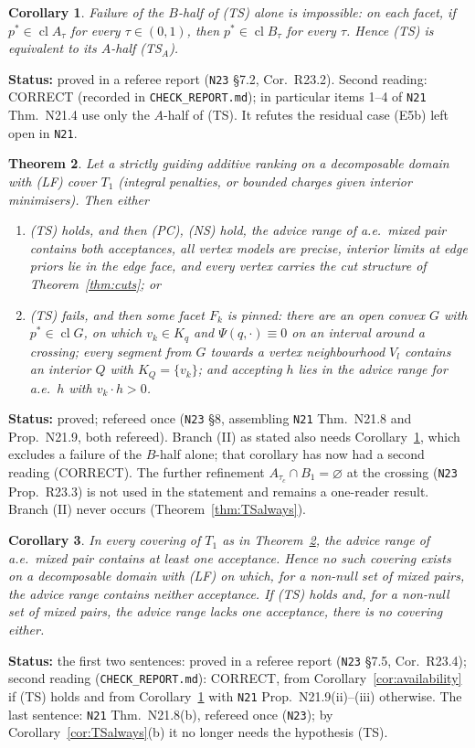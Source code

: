\documentclass[11pt]{article}
\newtheorem{theorem}{Theorem}[section]
\newtheorem{corollary}[theorem]{Corollary}
\theoremstyle{definition}
\theoremstyle{remark}
\newcommand{\cl}{\operatorname{cl}}
\newcommand{\src}[1]{\texttt{#1}}
\newcommand{\status}[1]{\par\smallskip\noindent\textbf{Status:} #1\par\smallskip}
\begin{document}
\begin{corollary}\label{cor:R232}
Failure of the $B$-half of (TS) alone is impossible: on each facet, if $p^*\in\cl A_\tau$ for every $\tau\in(0,1)$, then $p^*\in\cl B_\tau$ for every $\tau$. Hence (TS) is equivalent to its $A$-half (TS$_A$).
\end{corollary}
\status{proved in a referee report (\src{N23} \S7.2, Cor.~R23.2). Second reading: CORRECT (recorded in \src{CHECK\_REPORT.md}); in particular items 1--4 of \src{N21} Thm.~N21.4 use only the $A$-half of (TS). It refutes the residual case (E5b) left open in \src{N21}.}

\begin{theorem}\label{thm:dichotomy}
Let a strictly guiding additive ranking on a decomposable domain with (LF) cover $T_1$ (integral penalties, or bounded charges given interior minimisers). Then either
\begin{enumerate}[leftmargin=*,label=(\Roman*)]
\item (TS) holds, and then (PC), (NS) hold, the advice range of a.e.\ mixed pair contains both acceptances, all vertex models are precise, interior limits at edge priors lie in the edge face, and every vertex carries the cut structure of Theorem~\ref{thm:cuts}; or
\item (TS) fails, and then some facet $F_k$ is pinned: there are an open convex $G$ with $p^*\in\cl G$, on which $v_k\in K_q$ and $\Psi(q,\cdot)\equiv0$ on an interval around a crossing; every segment from $G$ towards a vertex neighbourhood $V_l$ contains an interior $Q$ with $K_Q=\{v_k\}$; and accepting $h$ lies in the advice range for a.e.\ $h$ with $v_k\cdot h>0$.
\end{enumerate}
\end{theorem}
\status{proved; refereed once (\src{N23} \S8, assembling \src{N21} Thm.~N21.8 and Prop.~N21.9, both refereed). Branch (II) as stated also needs Corollary~\ref{cor:R232}, which excludes a failure of the $B$-half alone; that corollary has now had a second reading (CORRECT). The further refinement $A_{\tau_c}\cap B_1=\varnothing$ at the crossing (\src{N23} Prop.~R23.3) is not used in the statement and remains a one-reader result. Branch (II) never occurs (Theorem~\ref{thm:TSalways}).}

\begin{corollary}\label{cor:R234}
In every covering of $T_1$ as in Theorem~\ref{thm:dichotomy}, the advice range of a.e.\ mixed pair contains at least one acceptance. Hence no such covering exists on a decomposable domain with (LF) on which, for a non-null set of mixed pairs, the advice range contains neither acceptance. If (TS) holds and, for a non-null set of mixed pairs, the advice range lacks one acceptance, there is no covering either.
\end{corollary}
\status{the first two sentences: proved in a referee report (\src{N23} \S7.5, Cor.~R23.4); second reading (\src{CHECK\_REPORT.md}): CORRECT, from Corollary~\ref{cor:availability} if (TS) holds and from Corollary~\ref{cor:R232} with \src{N21} Prop.~N21.9(ii)--(iii) otherwise. The last sentence: \src{N21} Thm.~N21.8(b), refereed once (\src{N23}); by Corollary~\ref{cor:TSalways}(b) it no longer needs the hypothesis (TS).}
\end{document}
